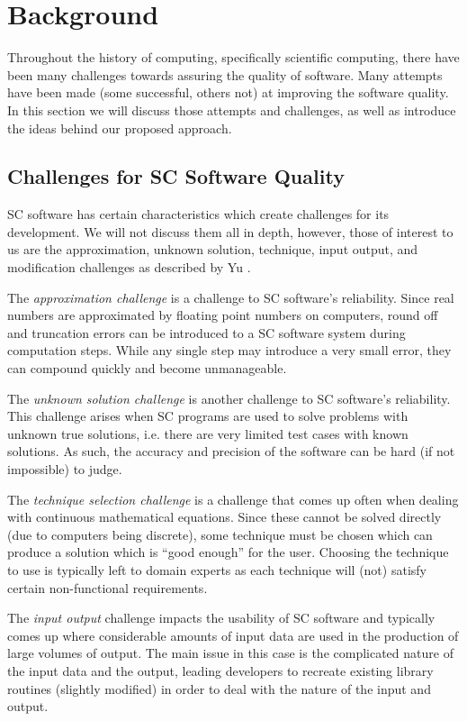 \documentclass[10pt, preprint]{sigplanconf}
\begin{document}
\section{Background}
\label{sec:background}

Throughout the history of computing, specifically scientific computing, there have been many challenges towards assuring the quality of software. Many attempts have been made (some successful, others not) at improving the software quality. In this section we will discuss those attempts and challenges, as well as introduce the ideas behind our proposed approach.

\subsection{Challenges for SC Software Quality}
\label{subsec:challenges}

SC software has certain characteristics which create challenges for its development. We will not discuss them all in depth, however, those of interest to us are the approximation, unknown solution, technique, input output, and modification challenges as described by Yu \cite{Yu2011}.

The \textit{approximation challenge} is a challenge to SC software's reliability. Since real numbers are approximated by floating point numbers on computers, round off and truncation errors can be introduced to a SC software system during computation steps. While any single step may introduce a very small error, they can compound quickly and become unmanageable. 

The \textit{unknown solution challenge} is another challenge to SC software's reliability. This challenge arises when SC programs are used to solve problems with unknown true solutions, i.e. there are very limited test cases with known solutions. As such, the accuracy and precision of the software can be hard (if not impossible) to judge.

The \textit{technique selection challenge} is a challenge that comes up often when dealing with continuous mathematical equations. Since these cannot be solved directly (due to computers being discrete), some technique must be chosen which can produce a solution which is ``good enough'' for the user. Choosing the technique to use is typically left to domain experts as each technique will (not) satisfy certain non-functional requirements.

The \textit{input output} challenge impacts the usability of SC software and typically comes up where considerable amounts of input data are used in the production of large volumes of output. The main issue in this case is the complicated nature of the input data and the output, leading developers to recreate existing library routines (slightly modified) in order to deal with the nature of the input and output.
\end{document}
